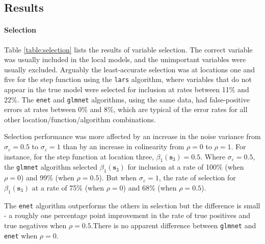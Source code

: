 \documentclass[authoryear, review, 11pt]{elsarticle}
\begin{document}
	\subsection{Results}
	
	\paragraph{Selection} Table \ref{table:selection} lists the results of variable selection. The correct variable was usually included in the local models, and the unimportant variables were usually excluded. Arguably the least-accurate selection was at locations one and five for the step function using the \verb!lars! algorithm, where variables that do not appear in the true model were selected for inclusion at rates between 11\% and 22\%. The \verb!enet! and \verb!glmnet! algorithms, using the same data, had false-positive errors at rates between 0\% and 8\%, which are typical of the error rates for all other location/function/algorithm combinations.
	
	Selection performance was more affected by an increase in the noise variance from $\sigma_{\varepsilon}=0.5$ to $\sigma_{\varepsilon}=1$ than by an increase in colinearity from $\rho = 0$ to $\rho = 1$. For instance, for the step function at location three, $\beta_1(\bm{s}_3) = 0.5$. Where $\sigma_{\varepsilon}=0.5$, the \verb!glmnet! algorithm selected $\beta_1(\bm{s}_3) $ for inclusion at a rate of 100\% (when $\rho = 0$) and 99\% (when $\rho = 0.5$). But when $\sigma_{\varepsilon}=1$, the rate of selection for $\beta_1(\bm{s}_3)$ at a rate of 75\% (when $\rho = 0$) and 68\% (when $\rho = 0.5$).
	
	The \verb!enet! algorithm outperforms the others in selection but the difference is small - a roughly one percentage point improvement in the rate of true positives and true negatives when $\rho = 0.5$.There is no apparent difference between \verb!glmnet! and \verb!enet! when $\rho = 0$.  
	
\end{document}
